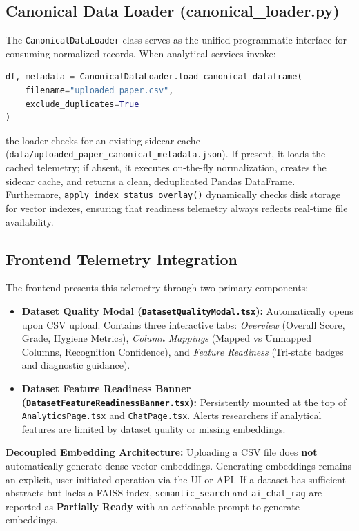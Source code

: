\subsection{Canonical Data Loader (canonical\_loader.py)}
The \texttt{CanonicalDataLoader} class serves as the unified programmatic interface for consuming normalized records. When analytical services invoke:

\begin{lstlisting}[language=python]
df, metadata = CanonicalDataLoader.load_canonical_dataframe(
    filename="uploaded_paper.csv",
    exclude_duplicates=True
)
\end{lstlisting}

\noindent the loader checks for an existing sidecar cache (\texttt{data/uploaded\_paper\_canonical\_metadata.json}). If present, it loads the cached telemetry; if absent, it executes on-the-fly normalization, creates the sidecar cache, and returns a clean, deduplicated Pandas DataFrame. Furthermore, \texttt{apply\_index\_status\_overlay()} dynamically checks disk storage for vector indexes, ensuring that readiness telemetry always reflects real-time file availability.

\subsection{Frontend Telemetry Integration}
The frontend presents this telemetry through two primary components:
\begin{itemize}
    \item \textbf{Dataset Quality Modal (\texttt{DatasetQualityModal.tsx}):} Automatically opens upon CSV upload. Contains three interactive tabs: \textit{Overview} (Overall Score, Grade, Hygiene Metrics), \textit{Column Mappings} (Mapped vs Unmapped Columns, Recognition Confidence), and \textit{Feature Readiness} (Tri-state badges and diagnostic guidance).
    \item \textbf{Dataset Feature Readiness Banner (\texttt{DatasetFeatureReadinessBanner.tsx}):} Persistently mounted at the top of \texttt{AnalyticsPage.tsx} and \texttt{ChatPage.tsx}. Alerts researchers if analytical features are limited by dataset quality or missing embeddings.
\end{itemize}

\noindent \textbf{Decoupled Embedding Architecture:} Uploading a CSV file does \textbf{not} automatically generate dense vector embeddings. Generating embeddings remains an explicit, user-initiated operation via the UI or API. If a dataset has sufficient abstracts but lacks a FAISS index, \texttt{semantic\_search} and \texttt{ai\_chat\_rag} are reported as \textbf{Partially Ready} with an actionable prompt to generate embeddings.
